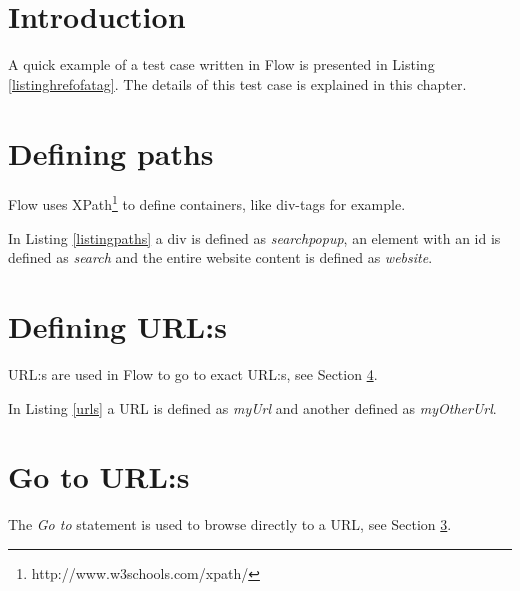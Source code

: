 \documentclass[a4paper,11pt]{kth-mag}
\begin{document}
\section{Introduction}
\label{flowintro}
A quick example of a test case written in Flow is presented in Listing \ref{listinghrefofatag}. The details of this test case is explained in this chapter.

\lstset{basicstyle=\footnotesize, caption=Find href of an a tag, label=listinghrefofatag, numbers=left, frame=single, captionpos=b}


\section{Defining paths}
Flow uses XPath\footnote{http://www.w3schools.com/xpath/} to define containers, like div-tags for example.

\lstset{basicstyle=\footnotesize, caption=Defining XPaths, label=listingpaths, numbers=left, frame=single, captionpos=b}


In Listing \ref{listingpaths} a div is defined as \textit{searchpopup}, an element with an id is defined as \textit{search} and the entire website content is defined as \textit{website}.

\section{Defining URL:s}
\label{flowurls}
URL:s are used in Flow to go to exact URL:s, see Section \ref{flowgoto}.

\lstset{basicstyle=\footnotesize, caption=Defining URLs, label=urls, numbers=left, frame=single, captionpos=b}


In Listing \ref{urls} a URL is defined as \textit{myUrl} and another defined as \textit{myOtherUrl}.

\section{Go to URL:s}
\label{flowgoto}
The \textit{Go to} statement is used to browse directly to a URL, see Section \ref{flowurls}.

\lstset{basicstyle=\footnotesize, caption=Go to statement, label=gotosimple, numbers=left, frame=single, captionpos=b}

\end{document}

